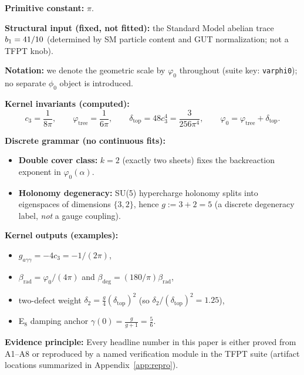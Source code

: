 \begin{tcolorbox}[colback=gray!4, colframe=gray!60, title={\textbf{Kernel specification (inputs $\to$ outputs)}}, fonttitle=\bfseries\small]
\textbf{Primitive constant:} $\pi$.

\textbf{Structural input (fixed, not fitted):} the Standard Model abelian trace $b_1=41/10$ (determined by SM particle content and GUT normalization; not a TFPT knob).

\textbf{Notation:} we denote the geometric scale by $\varphi_0$ throughout (suite key: \texttt{varphi0}); no separate $\phi_0$ object is introduced.

\textbf{Kernel invariants (computed):}
\[
c_3=\frac{1}{8\pi},\qquad 
\varphi_{\mathrm{tree}}=\frac{1}{6\pi},\qquad
\delta_{\mathrm{top}}=48c_3^4=\frac{3}{256\pi^4},\qquad
\varphi_0=\varphi_{\mathrm{tree}}+\delta_{\mathrm{top}}.
\]

\textbf{Discrete grammar (no continuous fits):}
\begin{itemize}[leftmargin=1.5em, topsep=2pt, itemsep=1pt]
    \item \textbf{Double cover class:} $k=2$ (exactly two sheets) fixes the backreaction exponent in $\varphi_0(\alpha)$.
    \item \textbf{Holonomy degeneracy:} SU(5) hypercharge holonomy splits into eigenspaces of dimensions $\{3,2\}$, hence $g:=3+2=5$ (a discrete degeneracy label, \emph{not} a gauge coupling).
\end{itemize}

\textbf{Kernel outputs (examples):}
\begin{itemize}[leftmargin=1.5em, topsep=2pt, itemsep=1pt]
    \item $g_{a\gamma\gamma}=-4c_3=-1/(2\pi)$,
    \item $\beta_{\mathrm{rad}}=\varphi_0/(4\pi)$ and $\beta_{\mathrm{deg}}=(180/\pi)\beta_{\mathrm{rad}}$,
    \item two-defect weight $\delta_2=\tfrac{g}{4}(\delta_{\mathrm{top}})^2$ (so $\delta_2/(\delta_{\mathrm{top}})^2=1.25$),
    \item E$_8$ damping anchor $\gamma(0)=\tfrac{g}{g+1}=\tfrac56$.
\end{itemize}

\textbf{Evidence principle:} Every headline number in this paper is either proved from A1--A8 or reproduced by a named verification module in the TFPT suite (artifact locations summarized in Appendix~\ref{app:repro}).
\end{tcolorbox}

